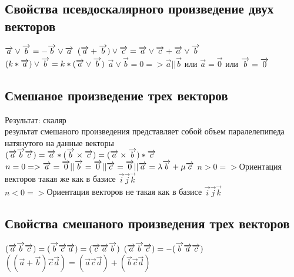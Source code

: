 \documentclass{book}
\begin{document}
\subsection{Свойства псевдоскалярного произведение двух векторов}
$\overrightarrow{a}\vee\overrightarrow{b}=-\overrightarrow{b}\vee\overrightarrow{a}\\$
$(\overrightarrow{a}+\overrightarrow{b})\vee\overrightarrow{c}=\overrightarrow{a}\vee\overrightarrow{c}+\overrightarrow{a}\vee\overrightarrow{b}\\$
$(k*\overrightarrow{a})\vee\overrightarrow{b}=k*(\overrightarrow{a}\vee\overrightarrow{b})\\$
$\overrightarrow{a}\vee\overrightarrow{b}=0 => \overrightarrow{a}||\overrightarrow{b}$ или $\overrightarrow{a}=\overrightarrow{0}$ или $\overrightarrow{b}=\overrightarrow{0}\\$
\subsection{Смешаное произведение трех векторов}
Результат: скаляр\\
результат смешаного произведения представляет собой объем паралелепипеда натянутого на данные векторы\\ 
$(\overrightarrow{a} \overrightarrow{b} \overrightarrow{c})=\overrightarrow{a}*(\overrightarrow{b}\times\overrightarrow{c})=(\overrightarrow{a}\times\overrightarrow{b})*\overrightarrow{c}\\$
$n=0 => \overrightarrow{a}=\overrightarrow{0}||\overrightarrow{b}=\overrightarrow{0}||\overrightarrow{c}=\overrightarrow{0}||\overrightarrow{a}=\lambda\overrightarrow{b}+\mu\overrightarrow{c}\\$
$n>0 => $Ориентация векторов такая же как в базисе $\overrightarrow{i}\overrightarrow{j}\overrightarrow{k}$\\
$n<0 => $Ориентация векторов не такая как в базисе $\overrightarrow{i}\overrightarrow{j}\overrightarrow{k}$\\
\subsection{Свойства смешаного произведения трех векторов}
$(\overrightarrow{a}\overrightarrow{b}\overrightarrow{c})=(\overrightarrow{b}\overrightarrow{c}\overrightarrow{a})=(\overrightarrow{c}\overrightarrow{a}\overrightarrow{b})\\$
$(\overrightarrow{a}\overrightarrow{b}\overrightarrow{c})=-(\overrightarrow{b}\overrightarrow{a}\overrightarrow{c})\\$
$((\overrightarrow{a}+\overrightarrow{b})\overrightarrow{c}\overrightarrow{d})=(\overrightarrow{a}\overrightarrow{c}\overrightarrow{d})+(\overrightarrow{b}\overrightarrow{c}\overrightarrow{d})$
\end{document}
